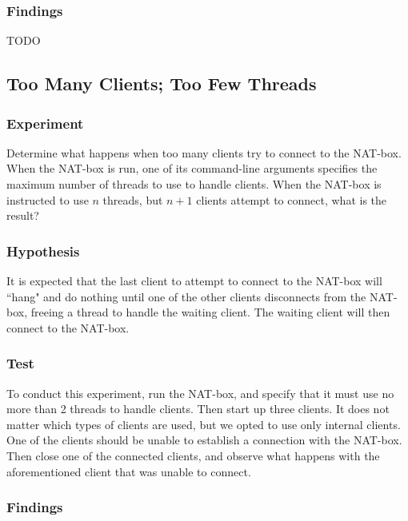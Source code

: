 \documentclass[10pt, a4paper]{article}
\begin{document}
\subsubsection{Findings}
\label{sssec:dupfind}

TODO


\subsection{Too Many Clients; Too Few Threads}
\label{ssec:toomany}


\subsubsection{Experiment}
\label{sssec:toomanyexp}

Determine what happens when too many clients try to connect to the NAT-box. When
the NAT-box is run, one of its command-line arguments specifies the maximum
number of threads to use to handle clients. When the NAT-box is instructed to
use $n$ threads, but $n + 1$ clients attempt to connect, what is the result?


\subsubsection{Hypothesis}
\label{sssec:toomanyhyp}

It is expected that the last client to attempt to connect to the NAT-box will
``hang" and do nothing until one of the other clients disconnects from the
NAT-box, freeing a thread to handle the waiting client. The waiting client will
then connect to the NAT-box.


\subsubsection{Test}
\label{sssec:toomanytest}

To conduct this experiment, run the NAT-box, and specify that it must use no
more than 2 threads to handle clients. Then start up three clients. It does not
matter which types of clients are used, but we opted to use only internal
clients. One of the clients should be unable to establish a connection with the
NAT-box. Then close one of the connected clients, and observe what happens with
the aforementioned client that was unable to connect.


\subsubsection{Findings}
\label{sssec:toomanyfind}
\end{document}

